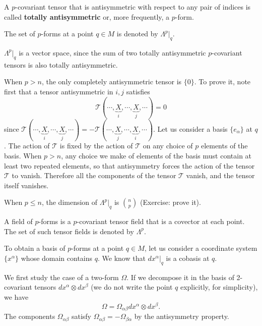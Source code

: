 \begin{points}
\item A $p$-covariant tensor that is antisymmetric with respect to any pair of indices is called \textbf{totally antisymmetric} or, more frequently, a $p$-form.

\item The set of $p$-forms at a point $q\in M$ is denoted by $\Lambda^p|_q$.

\item $\Lambda^p|_q$ is a vector space, since the sum of two totally antisymmetric $p$-covariant tensors is also totally antisymmetric.

\item When $p>n$, the only completely antisymmetric tensor is $\{0\}$. To prove it, note first that a tensor antisymmetric in $i,j$ satisfies
\[
  \mathcal T(\cdots,\underbrace{X}_i,\cdots,\underbrace{X}_j,\cdots)=0
\]
since $\mathcal T(\cdots,\underbrace{X}_i,\cdots,\underbrace{X}_j,\cdots)=-\mathcal T(\cdots,\underbrace{X}_j,\cdots,\underbrace{X}_i,\cdots)$. Let us consider a basis $\{e_\alpha\}$ at $q$. The action of $\mathcal T$ is fixed by the action of $\mathcal T$ on any choice of $p$ elements of the basis. When $p>n$, any choice we make of elements of the basis must contain at least two repeated elements, so that antisymmetry forces the action of the tensor $\mathcal T$ to vanish. Therefore all the components of the tensor $\mathcal T$ vanish, and the tensor itself vanishes.

\item When $p\leq n$, the dimension of $\Lambda^p|_q$ is $\binom np$ (Exercise: prove it).

\item A field of $p$-forms is a $p$-covariant tensor field that is a covector at each point. The set of such tensor fields is denoted by $\Lambda^p$.

\item To obtain a basis of $p$-forms at a point $q\in M$, let us consider a coordinate system $\{x^\alpha\}$ whose domain contains $q$. We know that $dx^\alpha|_q$ is a cobasis at $q$.

\item We first study the case of a two-form $\Omega$. If we decompose it in the basis of 2-covariant tensors $dx^\alpha\otimes dx^\beta$ (we do not write the point $q$ explicitly, for simplicity), we have
\[
  \Omega=\Omega_{\alpha\beta}dx^\alpha\otimes dx^\beta .
\]
The components $\Omega_{\alpha\beta}$ satisfy $\Omega_{\alpha\beta}=-\Omega_{\beta\alpha}$ by the antisymmetry property.


\end{points}
